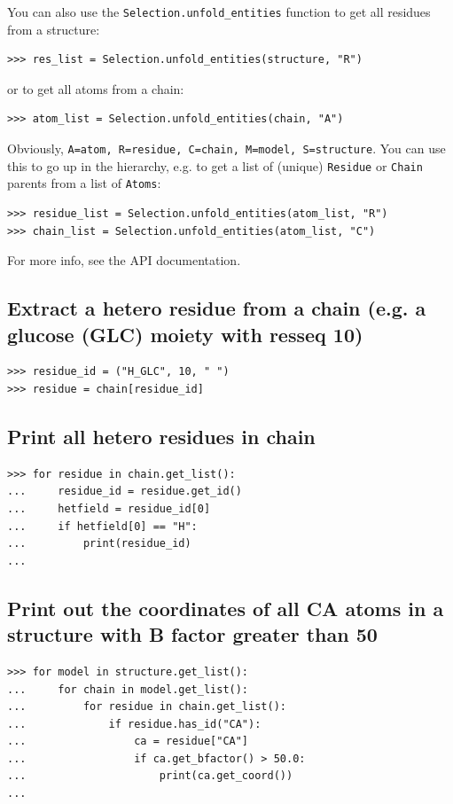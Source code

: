 You can also use the \verb+Selection.unfold_entities+ function to get all residues from a structure:
\begin{verbatim}
>>> res_list = Selection.unfold_entities(structure, "R")
\end{verbatim}
or to get all atoms from a chain:
\begin{verbatim}
>>> atom_list = Selection.unfold_entities(chain, "A")
\end{verbatim}
Obviously, \verb+A=atom, R=residue, C=chain, M=model, S=structure+.
You can use this to go up in the hierarchy, e.g. to get a list of
(unique) \verb+Residue+ or \verb+Chain+ parents from a list of
\verb+Atoms+:

\begin{verbatim}
>>> residue_list = Selection.unfold_entities(atom_list, "R")
>>> chain_list = Selection.unfold_entities(atom_list, "C")
\end{verbatim}
For more info, see the API documentation.

\subsection*{Extract a hetero residue from a chain (e.g. a glucose (GLC) moiety with resseq 10)}

\begin{verbatim}
>>> residue_id = ("H_GLC", 10, " ")
>>> residue = chain[residue_id]
\end{verbatim}

\subsection*{Print all hetero residues in chain}

\begin{verbatim}
>>> for residue in chain.get_list():
...     residue_id = residue.get_id()
...     hetfield = residue_id[0]
...     if hetfield[0] == "H":
...         print(residue_id)
...
\end{verbatim}

\subsection*{Print out the coordinates of all CA atoms in a structure with B factor greater than 50}

\begin{verbatim}
>>> for model in structure.get_list():
...     for chain in model.get_list():
...         for residue in chain.get_list():
...             if residue.has_id("CA"):
...                 ca = residue["CA"]
...                 if ca.get_bfactor() > 50.0:
...                     print(ca.get_coord())
...
\end{verbatim}

